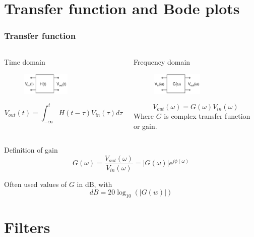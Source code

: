 \documentclass[beamer]{standalone}
\begin{document}
\section{Transfer function and Bode plots}
\begin{frame}
 \frametitle{Transfer function}
   \begin{columns}[t]
    \begin{column}{.45\textwidth}
     Time domain
     \begin{figure}
      \includegraphics[width=0.55\textwidth]{./circuits/black_box_transfer_in_time.pdf}
     \end{figure}
     \[V_{out}(t)=\int^t_{-\infty} H(t-\tau) V_{in}(\tau) d \tau \]
    \end{column}
    \begin{column}{.45\textwidth}
     Frequency domain
     \begin{figure}
      \includegraphics[width=0.55\textwidth]{./circuits/black_box_transfer_in_freq.pdf}
     \end{figure}
     \[V_{out}(\omega)=G(\omega) V_{in}(\omega) \]
     Where $G$ is complex transfer function or gain.
    \end{column}
   \end{columns}
   \begin{block}{Definition of gain}
    \[ G(\omega)=\frac{V_{out}(\omega)}{V_{in}(\omega)} = |G(\omega)| e^{j \phi(\omega)} \]
   \end{block}
   Often used values of $G$ in dB, with
   \[ dB = 20 \log_{10} (|G(w)|) \]
\end{frame}

\section{Filters}
\end{document}
